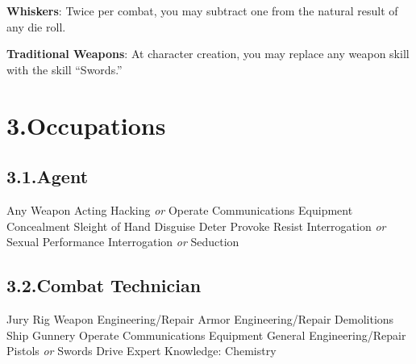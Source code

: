 \documentclass{article}
\begin{document}
\noindent{}\textbf{Whiskers}: Twice per combat, you may subtract one from the natural result of any die roll. %

\textbf{Traditional Weapons}: At character creation, you may replace any weapon skill with the skill \textquotedblleft{}Swords.\textquotedblright{}%

\mdhr{}%

\section{3.\hspace*{0.5em}Occupations}\label{sec-occupations}%

\subsection{3.1.\hspace*{0.5em}Agent}\label{sec-agent}%

\noindent{}Any Weapon\mdbr
{}Acting\mdbr
{}Hacking \emph{or} Operate Communications Equipment\mdbr
{}Concealment\mdbr
{}Sleight of Hand\mdbr
{}Disguise\mdbr
{}Deter\mdbr
{}Provoke\mdbr
{}Resist Interrogation \emph{or} Sexual Performance\mdbr
{}Interrogation \emph{or} Seduction %

\subsection{3.2.\hspace*{0.5em}Combat Technician}\label{sec-combat-technician}%

\noindent{}Jury Rig\mdbr
{}Weapon Engineering/Repair\mdbr
{}Armor Engineering/Repair\mdbr
{}Demolitions\mdbr
{}Ship Gunnery\mdbr
{}Operate Communications Equipment \mdbr
{}General Engineering/Repair\mdbr
{}Pistols \emph{or} Swords\mdbr
{}Drive\mdbr
{}Expert Knowledge: Chemistry %
\end{document}
